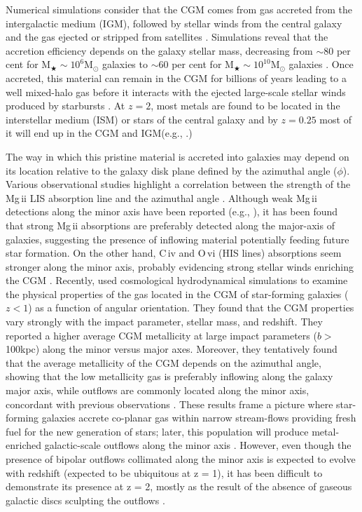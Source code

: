\documentclass[longauth]{aa}
\begin{document}
Numerical simulations consider that the CGM comes from gas accreted from the
intergalactic medium (IGM), followed by stellar winds from the central galaxy
and the gas ejected or stripped from satellites \citep
{Hafen19,Christensen18}. Simulations reveal that the accretion efficiency
depends on the galaxy stellar mass, decreasing from $\sim$80 per cent for M$_
{\bigstar} \sim 10^{6}$M$_{\odot}$ galaxies to $\sim$60 per cent for M$_
{\bigstar} \sim 10^{10}$M$_{\odot}$ galaxies
\citep{Dekel05,Keres05,Hafen20}. Once accreted, this material can remain in
the CGM for billions of years leading to a well mixed-halo gas before it
interacts with the ejected large-scale stellar winds produced by starbursts
\citep{Martin05,Weiner09}. At $z=2$, most metals are found to be located in
the interstellar medium (ISM) or stars of the central galaxy and by $z=0.25$
most of it  will end up in the CGM and IGM(e.g., \citealt
{Peeples14,Angles17,Hafen20,Oppenheimer16,Nelson21}.)

The way in which this pristine material is accreted into galaxies may depend
on its location relative to the galaxy disk plane defined by the azimuthal
angle ($\phi$). Various observational studies highlight a correlation between
the strength of the Mg\,{\sc ii} LIS absorption line and the azimuthal
angle 
\citep{Bordoloi11,Bordoloi14a,Kacprzak11b,Bouche12,Bouche13}. Although weak
Mg\,{\sc ii} detections along the minor axis have been reported
(e.g.,  \citealt{Lan14}), it has been found that strong Mg\,{\sc ii}
absorptions are preferably detected along the major-axis of galaxies,
suggesting the presence of inflowing material potentially feeding future
star formation. On the other hand, C\,{\sc iv} and O\,{\sc vi} (HIS lines)
absorptions seem stronger along the minor axis, probably evidencing strong
stellar winds enriching the CGM 
\citep{Tumlinson11a,Kacprzak15a}. Recently, 
\cite{Peroux20b} used cosmological hydrodynamical simulations to examine the
physical properties of the gas located in the CGM of star-forming galaxies
($z<1$) as a function of angular orientation. They found that the CGM
properties vary strongly with the impact parameter, stellar mass, and
redshift. They reported a higher average CGM metallicity at large impact
parameters ($b>$100kpc) along the minor versus major axes. Moreover, they
tentatively found that the average metallicity of the CGM depends on the
azimuthal angle, showing that the low metallicity gas is preferably
inflowing along the galaxy major axis, while outflows are commonly located
along the minor axis, concordant with previous observations 
\citep{Bordoloi11,Bouche12,Kacprzak12a,Kacprzak15a}. These results frame a
picture where star-forming galaxies accrete co-planar gas within narrow
stream-flows providing fresh fuel for the new generation of stars; later,
this population will produce metal-enriched galactic-scale outflows along
the minor axis \citep{Kacprzak17}. However, even though the presence of
bipolar outflows collimated along the minor axis is expected to evolve with
redshift (expected to be ubiquitous at z = 1),  it has been difficult to
demonstrate its presence at z = 2, mostly as the result of the absence of gaseous
galactic discs sculpting the outflows \citep{Nelson19}.
\end{document}
